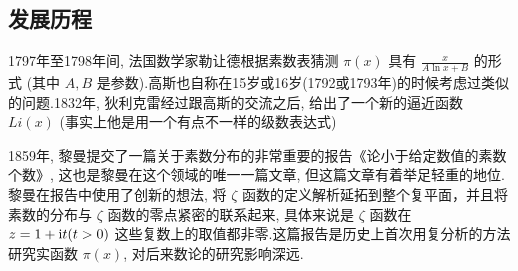 \documentclass[main]{subfiles}
\def\i{\textup{i}}
\begin{document}
\subsection{发展历程}
1797年至1798年间, 法国数学家勒让德根据素数表猜测 $\pi (x)$ 具有 $\frac{x}{A\ln x + B}$ 的形式 (其中 $A,B$ 是参数).高斯也自称在15岁或16岁(1792或1793年)的时候考虑过类似的问题.1832年, 狄利克雷经过跟高斯的交流之后, 给出了一个新的逼近函数 $Li(x)$ (事实上他是用一个有点不一样的级数表达式)
\par 1859年, 黎曼提交了一篇关于素数分布的非常重要的报告《论小于给定数值的素数个数》, 这也是黎曼在这个领域的唯一一篇文章, 但这篇文章有着举足轻重的地位.黎曼在报告中使用了创新的想法, 将
 $\zeta$ 函数的定义解析延拓到整个复平面，并且将素数的分布与
 $\zeta$ 函数的零点紧密的联系起来, 具体来说是 $\zeta $ 函数在 $z = 1 + \i t (t>0)$ 这些复数上的取值都非零.这篇报告是历史上首次用复分析的方法研究实函数 $\pi(x)$, 对后来数论的研究影响深远.
\end{document}
